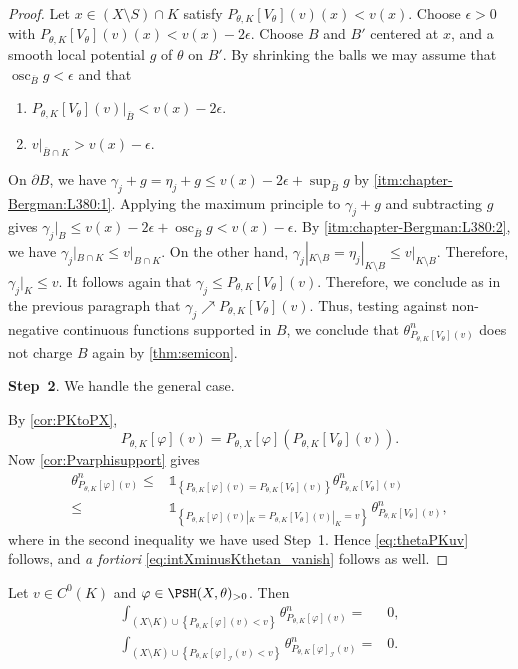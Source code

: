 \begin{proof}
Let $x\in (X\setminus S) \cap K$ satisfy $P_{\theta,K}[V_{\theta}](v)(x)<v(x)$. Choose $\epsilon>0$ with $P_{\theta,K}[V_{\theta}](v)(x)<v(x)-2\epsilon$. Choose $B$ and $B'$ centered at $x$, and a smooth local potential $g$ of $\theta$ on $B'$. By shrinking the balls we may assume that $\operatorname{osc}_{\overline B} g<\epsilon$ and that
\begin{enumerate}
    \item\label{itm:chapter-Bergman:L380:1} $P_{\theta,K}[V_{\theta}](v)|_{\overline B}<v(x)-2\epsilon$.
    \item\label{itm:chapter-Bergman:L380:2} $v|_{\overline B\cap K}>v(x)-\epsilon$.
\end{enumerate}
On $\partial B$, we have $\gamma_j+g=\eta_j+g\leq v(x)-2\epsilon+\sup_{\overline B} g$ by \ref{itm:chapter-Bergman:L380:1}. Applying the maximum principle to $\gamma_j+g$ and subtracting $g$ gives $\gamma_j|_B\leq v(x)-2\epsilon+\operatorname{osc}_{\overline B}g<v(x)-\epsilon$. By \ref{itm:chapter-Bergman:L380:2}, we have $\gamma_j|_{B\cap K}\leq v|_{B\cap K}$. On the other hand, $\gamma_j|_{K\setminus B}=\eta_{j}|_{K\setminus B}\leq v|_{K\setminus B}$. Therefore, $\gamma_j|_K\leq v$. It follows again that $\gamma_j\leq P_{\theta,K}[V_{\theta}](v)$. Therefore, we conclude as in the previous paragraph that $\gamma_j\nearrow P_{\theta,K}[V_{\theta}](v)$. Thus, testing against non-negative continuous functions supported in $B$, we conclude that $\theta^n_{P_{\theta,K}[V_{\theta}](v)}$ does not charge $B$ again by \cref{thm:semicon}.

\textbf{Step~2}. We handle the general case.

By \cref{cor:PKtoPX},
\[
P_{\theta,K}[\varphi](v) = P_{\theta,X}[\varphi]\left(P_{\theta,K}[V_{\theta}](v)\right).
\]
Now \cref{cor:Pvarphisupport} gives
\[
\begin{aligned}
\theta_{P_{\theta,K}[\varphi](v)}^n \leq & \mathds{1}_{\left\{P_{\theta,K}[\varphi](v) = P_{\theta,K}[V_{\theta}](v)\right\}} \theta_{P_{\theta,K}[V_{\theta}](v)}^n \\
\leq & \mathds{1}_{\left\{P_{\theta,K}[\varphi](v)|_K=P_{\theta,K}[V_{\theta}](v)|_K=v\right\}}\,\theta_{P_{\theta,K}[V_{\theta}](v)}^n,
\end{aligned}
\]
where in the second inequality we have used Step~1. Hence \eqref{eq:thetaPKuv} follows, and \emph{a fortiori} \eqref{eq:intXminusKthetan_vanish} follows as well.
\end{proof}

\begin{corollary}\label{cor:suppthetan}
Let $v\in C^0(K)$ and $\varphi\in \PSH(X,\theta)_{>0}$. Then
\begin{equation}\label{eq:thetandoesnotcharge1}
\begin{aligned}
\int_{(X\setminus K)\cup \left\{P_{\theta,K}[\varphi](v)<v\right\}}\theta^n_{P_{\theta,K}[\varphi](v)}=& 0,\\
\int_{(X\setminus K)\cup \left\{P_{\theta,K}[\varphi]_{\mathcal{I}}(v)<v\right\}}\theta^n_{P_{\theta,K}[\varphi]_{\mathcal{I}}(v)}=& 0.
\end{aligned}
\end{equation}
\end{corollary}


